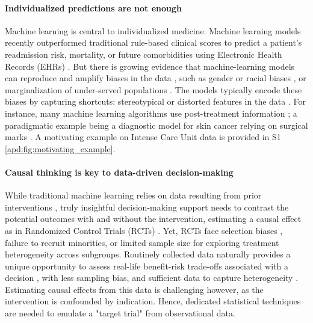 \documentclass[10pt,letterpaper]{article}
\begin{document}
\paragraph{Individualized predictions are not enough}
Machine learning is central to individualized medicine. Machine learning models
recently outperformed traditional rule-based clinical scores to predict a
patient's readmission risk, mortality, or future comorbidities using Electronic
Health Records (EHRs) \cite{rajkomar2018scalable,
  liu2019comparison,li2020behrt,beaulieu2021machine, aggarwal2021diagnostic}.
%
But there is growing evidence that machine-learning models can reproduce and
amplify biases in the data \cite{rajkomar2018ensuring}, such as gender or
racial biases \cite{singh2022generalizability,gichoya2022ai}, or marginalization of
under-served populations \cite{seyyed2021underdiagnosis}. The models
typically encode these biases by capturing shortcuts: stereotypical or
distorted features in the data \cite{geirhos2020shortcut,winkler2019association,degrave2021ai}.
%
For instance, many machine learning algorithms use post-treatment information
\cite{badgeley2019deep,obermeyer2019dissecting,yuan2021temporal,wong2021external};
a paradigmatic example being a diagnostic model for skin cancer relying on
surgical marks \cite{winkler2019association}. A motivating example on Intense Care
Unit data is provided in S1 \ref{apd:fig:motivating_example}.


\paragraph{Causal thinking is key to data-driven decision-making} \cite{prosperi2020causal}
While traditional machine learning relies on data
resulting from prior interventions \cite{plecko2022causal}, truly insightful decision-making
support needs to contrast the potential outcomes with and without the
intervention, estimating a causal effect as in Randomized Control Trials (RCTs)
\cite{prosperi2020causal}.
Yet, RCTs face selection biases \cite{travers2007external,averitt2020translating}, failure to
recruit minorities, or limited sample size for exploring treatment heterogeneity
across subgroups. Routinely collected data naturally provides a unique
opportunity to assess real-life benefit-risk trade-offs associated with a
decision \cite{desai2021broadening}, with less sampling bias, and sufficient data to capture
heterogeneity \cite{rekkas2023standardized}. Estimating causal effects from this data is challenging
however, as the intervention is confounded by indication. Hence, dedicated
statistical techniques are needed to emulate a "target trial" \cite{hernan2016specifying} from
observational data.
\end{document}
